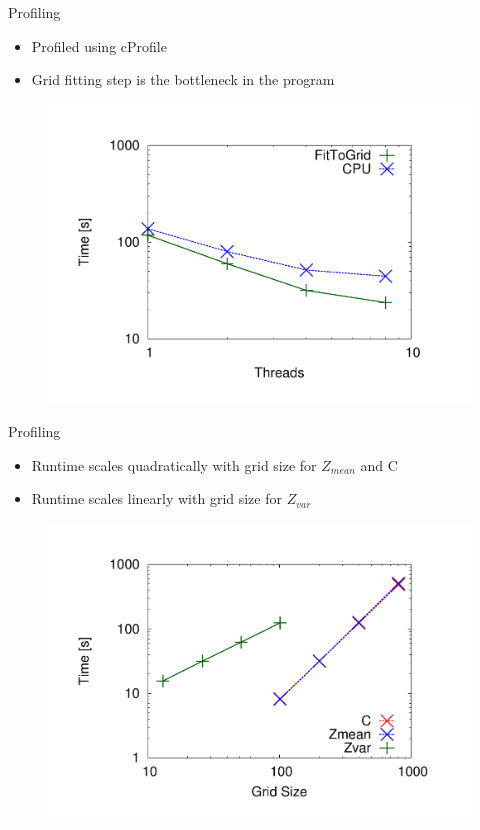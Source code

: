 \documentclass{beamer}
\begin{document}
\begin{frame}{Profiling}
\vspace{8pt}
\begin{itemize}
\item Profiled using cProfile
\item Grid fitting step is the bottleneck in the program
\end{itemize}

\begin{figure}
\includegraphics[scale=0.30]{plot_threads.pdf}
\end{figure}

\end{frame}



\begin{frame}{Profiling}
\vspace{8pt}
\begin{itemize}
\item Runtime scales quadratically with grid size for $Z_{mean}$ and C  
\item Runtime scales linearly with grid size for $Z_{var}$ 
\end{itemize}

\begin{figure}
\includegraphics[scale=0.30]{plot_gridsizes.pdf}
\end{figure}

\end{frame}
\end{document}
